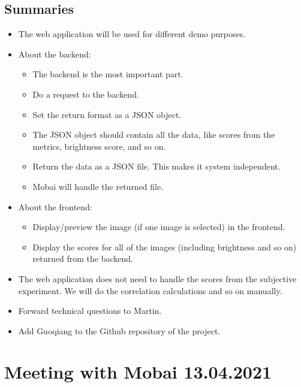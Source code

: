\subsection*{Summaries}
\begin{itemize}
    \item The web application will be used for different demo purposes.
    \item About the backend:
    \begin{itemize}
        \item The backend is the most important part.
        \item Do a request to the backend. 
        \item Set the return format as a JSON object.
        \item The JSON object should contain all the data, like scores from the metrics, brightness score, and so on.
        \item  Return the data as a JSON file. This makes it system independent.
        \item Mobai will handle the returned file.
        \end{itemize}
    \item About the frontend:
    \begin{itemize}
        \item Display/preview the image (if one image is selected) in the frontend.
        \item Display the scores for all of the images (including brightness and so on) returned from the backend.
    \end{itemize}
    \item The web application does not need to handle the scores from the subjective experiment. We will do the correlation calculations and so on manually.
    \item Forward technical questions to Martin.
    \item Add Guoqiang to the Github repository of the project.
\end{itemize}

\newpage

\section*{Meeting with Mobai 13.04.2021}
